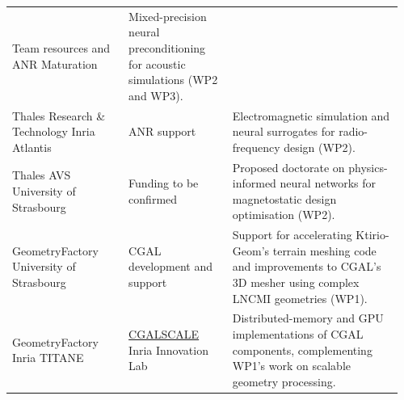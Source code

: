 \begin{table}[!htb]
\begin{tabular}{@{}
  >{\raggedright\arraybackslash}p{0.285\linewidth}
  >{\raggedright\arraybackslash}p{0.255\linewidth}
  >{\raggedright\arraybackslash}p{0.415\linewidth}@{}}
Team resources and ANR Maturation &
Mixed-precision neural preconditioning for acoustic simulations (WP2 and WP3).\\[2pt]
Thales Research \& Technology \newline Inria Atlantis &
ANR support &
Electromagnetic simulation and neural surrogates for radio-frequency design (WP2).\\[2pt]
Thales AVS \newline University of Strasbourg &
Funding to be confirmed &
Proposed doctorate on physics-informed neural networks for magnetostatic design optimisation (WP2).\\[2pt]
GeometryFactory \newline University of Strasbourg &
CGAL development and support &
Support for accelerating Ktirio-Geom's terrain meshing code and improvements
to CGAL's 3D mesher using complex LNCMI geometries (WP1).\\[2pt]
GeometryFactory \newline Inria TITANE &
\href{https://jobs.inria.fr/public/classic/classic/offres/2026-10293}{CGALSCALE}
\newline Inria Innovation Lab &
Distributed-memory and GPU implementations of CGAL components,
complementing WP1's work on scalable geometry processing.\\
\bottomrule
\end{tabular}
\end{table}
